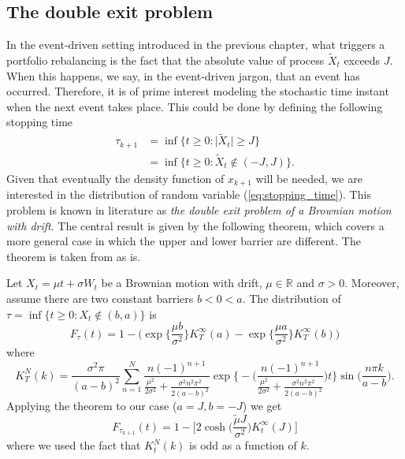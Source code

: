 \subsection{The double exit problem }
In the event-driven setting introduced in the previous chapter, what triggers a portfolio rebalancing is the fact that the absolute value of process $\widetilde{X}_t$ exceeds $J$. When this happens, we say, in the event-driven jargon, that an event has occurred. Therefore, it is of prime interest  modeling the stochastic time instant when the next event takes place. This could be done by defining the following stopping time
\begin{align}\label{eq:stopping_time}
\tau_{k+1} & = \inf\big\{t\geq 0 \colon \lvert\widetilde{X}_t\lvert\geq J \big\}\\\nonumber
& = \inf\big\{t\geq 0 \colon \widetilde{X}_t \notin (-J,J) \big\}.
\end{align}
Given that eventually the density function of $x_{k+1}$ will be needed, we are interested in the distribution of random variable (\ref{eq:stopping_time}). This problem is known in literature as \textit{the double exit problem of a Brownian motion with drift}. The central result is given by the following theorem, which covers a more general case in which the upper and lower barrier are different. The theorem is taken from \cite{Hieber2012} as is.
\begin{theorem}\label{thm:double_exit_problem}
	Let $X_t = \mu t + \sigma W_t$ be a Brownian motion with drift, $\mu \in \mathbb{R}$ and $\sigma > 0$. Moreover, assume there are two constant barriers $b<0<a$. The distribution of $\tau = \inf\big\{t\geq 0 \colon X_t \notin (b,a) \big\}$ is 
	\[
	F_{\tau}(t) = 1-\bigg(\exp\Big\{\frac{\mu b}{\sigma^2}\Big\}K_T^{\infty}(a)-\exp\Big\{\frac{\mu a}{\sigma^2}\Big\}K_T^{\infty}(b) \bigg)
	\]
	where
	\[
	K_T^N(k)= \frac{\sigma^2\pi}{(a-b)^2}\sum_{n=1}^{N}\frac{n(-1)^{n+1}}{\frac{\mu^2}{2\sigma^2}+\frac{\sigma^2n^2\pi^2}{2(a-b)^2}}\exp\bigg\{-\bigg(\frac{n(-1)^{n+1}}{\frac{\mu^2}{2\sigma^2}+\frac{\sigma^2n^2\pi^2}{2(a-b)^2}}\bigg)t\bigg\}\sin\Big(\frac{n\pi k}{a-b}\Big).
	\]
	Applying the theorem to our case ($a=J, b=-J$) we get 
	\begin{equation}
	F_{\tau_{k+1}}(t)=1-\bigg[2\cosh\Big(\frac{\widetilde{\mu}J}{\sigma^2}\Big)K_t^{\infty}(J)\bigg]
	\end{equation}
	where we used the fact that $K_t^N(k)$ is odd as a function of $k$.
\end{theorem}

